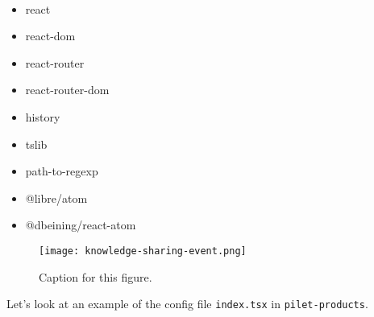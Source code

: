 \begin{lstlisting}[caption={}]
  

\end{lstlisting}

\begin{itemize}
    \item react
    \item react-dom
    \item react-router
    \item react-router-dom
    \item history
    \item tslib
    \item path-to-regexp
    \item @libre/atom
    \item @dbeining/react-atom
    
\end{itemize}

\begin{figure}[h!]
  \centering
  \captionsetup{justification=centering}
  \texttt{[image: knowledge-sharing-event.png]}
  \caption{Caption for this figure.}
  \label{fig:1}
\end{figure}


Let’s look at an example of the config file \verb|index.tsx| in \verb|pilet-products|.